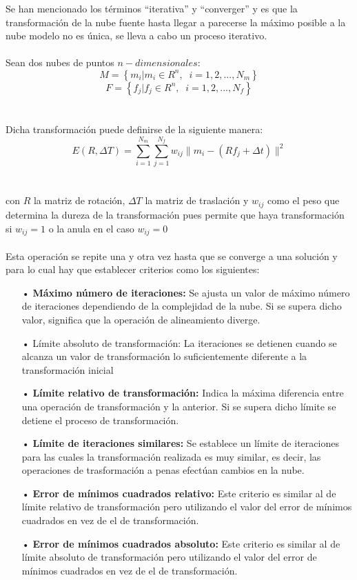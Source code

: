 Se han mencionado los términos ``iterativa'' y ``converger'' y es que la transformación de la nube fuente hasta llegar a parecerse la máximo posible a la nube modelo no es única, se lleva a cabo un proceso iterativo\cite{paper_registration}. 
\\
\\
Sean dos nubes de puntos $n-dimensionales$:
$$M=\left\lbrace m_{i} | m_{i} \in R^n,\;\;i=1,2,...,N_{m} \right\rbrace$$
$$F=\left\lbrace f_{j} | f_{j} \in R^n,\;\;i=1,2,...,N_{f} \right\rbrace$$
\\
\\
Dicha transformación puede definirse de la siguiente manera:
$$E(R,\Delta T)=\sum_{i=1}^{N_m} \sum_{j=1}^{N_f} w_{ij} \| m_{i}-(Rf_{j}+\Delta t)  \|^2$$
\\
\\
con $R$ la matriz de rotación, $\Delta T$ la matriz de traslación y $w_{ij}$ como el peso que determina la dureza de la transformación pues permite que haya transformación si $w_{ij}=1$ o la anula en el caso $w_{ij}=0$
\\
\\
Esta operación se repite una y otra vez hasta que se converge a una solución y para lo cual hay que establecer criterios como los siguientes:

\begin{itemize}
\item[•]\textbf{Máximo número de iteraciones:}
Se ajusta un valor de máximo número de iteraciones dependiendo de la complejidad de la nube. Si se supera dicho valor, significa que la operación de alineamiento diverge.
\item[•]Límite absoluto de transformación: 
La iteraciones se detienen cuando se alcanza un valor de transformación lo suficientemente diferente a la transformación inicial
\item[•]\textbf{Límite relativo de transformación:}
Indica la máxima diferencia entre una operación de transformación y la anterior. Si se supera dicho límite se detiene el proceso de transformación.
\item[•]\textbf{Límite de iteraciones similares: }
Se establece un límite de iteraciones para las cuales la transformación realizada es muy similar, es decir, las operaciones de trasformación a penas efectúan cambios en la nube.
\item[•]\textbf{Error de mínimos cuadrados relativo:}
Este criterio es similar al de límite relativo de transformación pero utilizando el valor del error de mínimos cuadrados en vez de el de transformación.
\item[•]\textbf{Error de mínimos cuadrados absoluto:}
Este criterio es similar al de límite absoluto de transformación pero utilizando el valor del error de mínimos cuadrados en vez de el de transformación.
\end{itemize}

